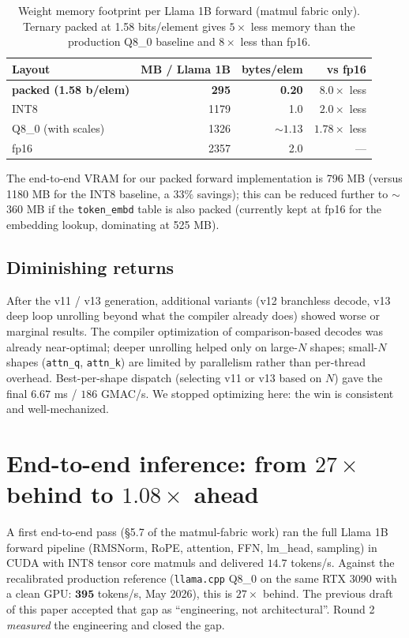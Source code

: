 \documentclass{article}
\begin{document}
\begin{table}[h]
\centering
\begin{tabular}{lrrr}
\toprule
Layout & MB / Llama 1B & bytes/elem & vs fp16 \\
\midrule
\textbf{packed (1.58 b/elem)} & \textbf{295} & \textbf{0.20} & $\mathbf{8.0\times}$ less \\
{INT8} & 1179 & 1.0 & $2.0\times$ less \\
Q8\_0 (with scales) \citep{ggml-quants} & 1326 & $\sim 1.13$ & $1.78\times$ less \\
fp16 & 2357 & 2.0 & --- \\
\bottomrule
\end{tabular}
\caption{Weight memory footprint per Llama 1B forward (matmul fabric
only). Ternary packed at 1.58 bits/element gives $5\times$ less memory
than the production Q8\_0 baseline and $8\times$ less than fp16.}
\end{table}

The end-to-end {VRAM} for our packed forward implementation is 796 MB
(versus 1180 MB for the {INT8} baseline, a $33\%$ savings); this can be
reduced further to $\sim$360 MB if the \texttt{token\_embd} table is
also packed (currently kept at fp16 for the embedding lookup, dominating
at 525 MB).

\subsection{Diminishing returns}

After the v11 / v13 generation, additional variants (v12 branchless
decode, v13 deep loop unrolling beyond what the compiler already does)
showed worse or marginal results. The compiler optimization of
comparison-based decodes was already near-optimal; deeper unrolling
helped only on large-$N$ shapes; small-$N$ shapes (\texttt{attn\_q},
\texttt{attn\_k}) are limited by parallelism rather than per-thread
overhead. Best-per-shape dispatch (selecting v11 or v13 based on $N$)
gave the final $6.67$ ms / $186$ {GMAC}/s. We stopped optimizing here:
the win is consistent and well-mechanized.

\section{End-to-end inference: from $27\times$ behind to $1.08\times$ ahead}
\label{sec:e2e}

A first end-to-end pass (\S5.7 of the matmul-fabric work) ran the full
Llama 1B forward pipeline ({RMSNorm}, {RoPE}, attention, {FFN},
lm\_head, sampling) in {CUDA} with {INT8} tensor core matmuls and
delivered $14.7$ tokens/s. Against the recalibrated production
reference (\texttt{llama.cpp} {Q8\_0} on the same {RTX 3090} with a
clean {GPU}: $\mathbf{395}$ tokens/s, May 2026), this is $27\times$
behind. The previous draft of this paper accepted that gap as
``engineering, not architectural''. Round 2 \emph{measured} the
engineering and closed the gap.
\end{document}
